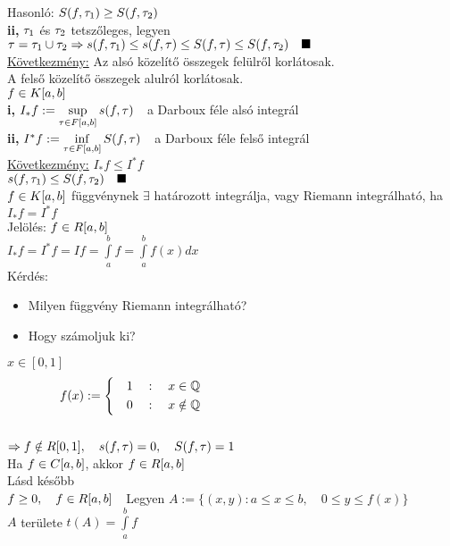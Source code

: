 \documentclass[a4paper,11pt]{article}
\begin{document}
Hasonló: $S(f,\tau_1)\geq S(f,\tau_2)$\\[0.2cm]\textbf{ii,} $\tau_1$ és $\tau_2$ tetszőleges,
legyen $\tau=\tau_1\cup\tau_2\\[0.2cm]\Rightarrow s(f,\tau_1)\leq s(f,\tau)\leq S(f,\tau)\leq
S(f,\tau_2)\quad\blacksquare$\\[0.3cm]
\underline{Következmény:} Az alsó közelítő összegek felülről korlátosak.\\[0.2cm]
\hspace*{2.7cm}A felső közelítő összegek alulról korlátosak.\\[0.2cm]
 $f\in K[a,b]$\\[0.2cm]\textbf{i,}
$I_*f:=\sup\limits_{\tau\in F[a,b]}s(f,\tau)\quad$a Darboux féle alsó integrál\\[0.2cm]
\textbf{ii,} $I^*f:=\inf\limits_{\tau\in F[a,b]}S(f,\tau)\quad$a Darboux féle felső
integrál\\[0.2cm]\underline{Következmény:} $I_*f\leq I^*f$\\[0.2cm]
\biz $s(f,\tau_1)\leq S(f,\tau_2)\quad\blacksquare$\\[0.2cm]
 $f\in K[a,b]$ függvénynek $\exists$ határozott integrálja, vagy Riemann
integrálható, ha $I_*f=I^*f$\\[0.1cm]Jelölés: $f\in R[a,b]$\\[0.2cm]
$I_*f=I^*f=If=\int\limits_{a}^{b}f=\int\limits_{a}^{b}f(x)dx$\\[0.2cm]
Kérdés:
\begin{itemize}
	\item Milyen függvény Riemann integrálható?
	\item Hogy számoljuk ki?
\end{itemize}
\pl $x\in[0,1]$
\[\displaystyle f(x) := 
\left\{
\begin{gathered}
\quad 1\quad:\quad x\in\Q\hspace{5.7cm} \\
\quad 0\quad:\quad x\notin\Q\hspace{5.7cm}
\end{gathered}\right. \]\\[0.2cm]
$\Rightarrow f\notin R[0,1],\quad s(f,\tau)=0,\quad S(f,\tau)=1$\\[0.2cm]
\tetel Ha $f\in C[a,b]$, akkor $f\in R[a,b]$\\[0.1cm]\biz Lásd később\\[0.2cm]
 $f\geq0,\quad f\in R[a,b]\quad$Legyen
$A:=\{(x,y):a\leq x\leq b,\quad0\leq y\leq f(x)\}$\\[0.2cm]
$A$ területe $t(A)=\int\limits_{a}^{b}f$\\[0.2cm]
\end{document}
